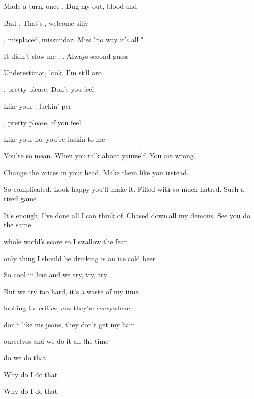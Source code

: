 

\zs
 Made a  turn, once . Dug my  out, blood and 

Bad . That's , welcome  silly 

, misplaced, missundaz. Miss "no way it's all "

It didn't slow me . . Always second guess

Underestimat, look, I'm still aro
\ks

\zr
{}, pretty please. Don't you  feel

Like your , fuckin' per

, pretty please, if you  feel

Like your no, you're fuckin  to me
\kr

\zs
You're so mean. When you talk about yourself. You are wrong. 

Change the voices in your head. Make them like you instead.

So complicated. Look happy you'll make it. Filled with so much hatred. Such a tired game

It's enough. I've done all I can think of. Chased down all my demons. See you do the same
\ks

\zr
\kr

\zs
{} whole world's scare so I swallow the fear

 only thing I should be drinking is an ice cold beer

So cool in line and we try, try, try

But we try too hard, it's a waste of my time

 looking for critics, cuz they're everywhere

 don't like me jeans, they don't get my hair

 ourselves and we do it all the time

 do we do that

Why do I do that

Why do I do that
\ks

\zr \kr

\kp
